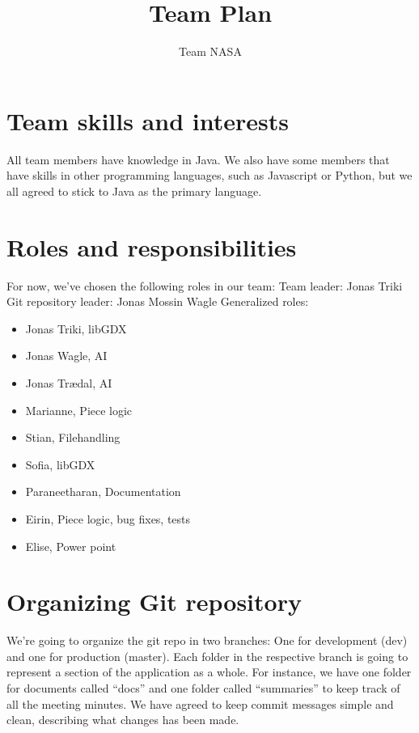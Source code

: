 \documentclass{article}
\title{Team Plan}
\author{Team NASA}
\date{}
\begin{document}
\maketitle

\section*{Team skills and interests}
All team members have knowledge in Java. We also have some members that have skills in other programming languages, such as Javascript or Python, but we all agreed to stick to Java as the primary language.

\section*{Roles and responsibilities}
For now, we've chosen the following roles in our team:
\newline Team leader: Jonas Triki
\newline Git repository leader: Jonas Mossin Wagle
\newline Generalized roles:
\begin{itemize}
    \item Jonas Triki, libGDX
    \item Jonas Wagle, AI
    \item Jonas Tr\ae dal, AI 
    \item Marianne, Piece logic 
    \item Stian, Filehandling
    \item Sofia, libGDX
    \item Paraneetharan, Documentation
    \item Eirin, Piece logic, bug fixes, tests
    \item Elise, Power point
    
\end{itemize}



\section*{Organizing Git repository}

We’re going to organize the git repo in two branches: One for development (dev) and one for production (master). Each folder in the respective branch is going to represent a section of the application as a whole. For instance, we have one folder for documents called “docs” and one folder called “summaries” to keep track of all the meeting minutes. We have agreed to keep commit messages simple and clean, describing what changes has been made.
\end{document}

